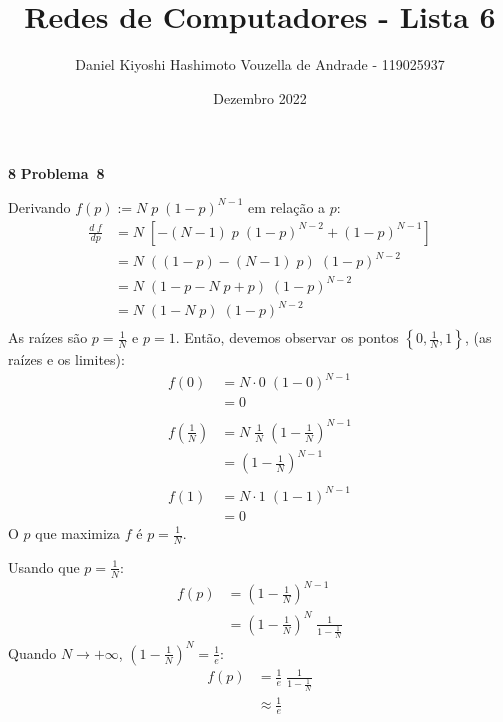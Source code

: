 \documentclass{article}
\title{Redes de Computadores - Lista 6}
\author{Daniel Kiyoshi Hashimoto Vouzella de Andrade - 119025937}
\date{Dezembro 2022}
\newcounter{exe-list}
\newenvironment{exe-list}
    {\begin{list}{\alph{exe-list}.}{\usecounter{exe-list}}}
    {\end{list}}
\newenvironment{exe}[2][Problema]
    {\newcommand{\opt}{(Opcional)}%
    \newcommand{\sketch}[1]{{\bfseries Rascunho:} ##1}%
    \medskip\par\noindent\ifthenelse{\equal{#1}{}}
        {\textbf{\large #2}}
        {\textbf{\large #1~#2}}%
    \medskip\par\noindent}
    {\medskip}
\begin{document}
\maketitle

\begin{exe}{8}
    \begin{exe-list}
    \item
        Derivando \(f(p) := N \; p \; (1 - p)^{N-1}\)
        em relação a \(p\):
        \begin{align*}
            \frac{d \; f}{dp} &=
            N \; \left[
                -(N-1) \; p \; (1 - p)^{N-2} + (1 - p)^{N-1}
            \right] \\
            &= N \; ( (1 - p) - (N-1) \; p ) \; (1 - p)^{N-2} \\
            &= N \; ( 1 - p - N \; p + p ) \; (1 - p)^{N-2} \\
            &= N \; ( 1 - N \; p ) \; (1 - p)^{N-2} \\
        \end{align*}
        As raízes são \(p = \frac1N\) e \(p = 1\).
        Então, devemos observar os pontos
        \( \left\{ 0, \frac1N, 1 \right\}\),
        (as raízes e os limites):
        \begin{align*}
            f(0)
                &= N \cdot 0 \; (1 - 0)^{N-1} \\
                &= 0 \\\\
            f\left(\frac1N\right)
                &= N \; \frac1N \; \left(1 - \frac1N\right)^{N-1} \\
                &= \left(1 - \frac1N\right)^{N-1} \\\\
            f(1)
                &= N \cdot 1 \; (1 - 1)^{N-1} \\
                &= 0
        \end{align*}
        O \(p\) que maximiza \(f\) é \(p = \frac1N\).
    \item
        Usando que \(p = \frac1N\):
        \begin{align*}
            f(p)
            &= \left(1 - \frac1N\right)^{N-1} \\
            &= \left(1 - \frac1N\right)^N \; \frac{1}{1 - \frac1N}
        \end{align*}
        Quando \(N \to +\infty\),
        \(\left(1 - \frac1N\right)^N = \frac1e\):
        \begin{align*}
            f(p)
            &= \frac1e \; \frac{1}{1 - \frac1N} \\
            &\approx \frac1e
        \end{align*}
    \end{exe-list}
\end{exe}
\end{document}
